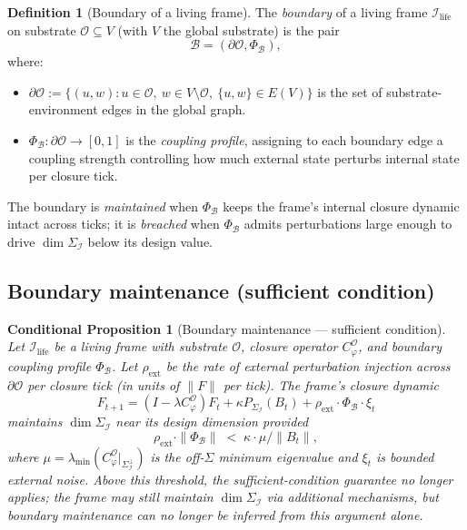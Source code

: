 \documentclass[11pt]{article}
\theoremstyle{plain}
\newtheorem{conditional}[theorem]{Conditional Proposition}
\theoremstyle{definition}
\newtheorem{definition}[theorem]{Definition}
\theoremstyle{remark}
\newcommand{\Ical}{\mathcal{I}}
\newcommand{\Ocal}{\mathcal{O}}
\newcommand{\Bcal}{\mathcal{B}}
\newcommand{\Cph}{C_\varphi}
\newcommand{\Ilife}{\Ical_{\mathrm{life}}}
\begin{document}
\begin{definition}[Boundary of a living frame]\label{def:boundary}
The \emph{boundary} of a living frame $\Ilife$ on substrate $\Ocal \subseteq V$ (with $V$ the global substrate) is the pair
\[
  \Bcal = (\partial \Ocal, \Phi_\Bcal),
\]
where:
\begin{itemize}[leftmargin=2em]
\item $\partial \Ocal := \{(u, w) : u \in \Ocal,\ w \in V \setminus \Ocal,\ \{u, w\} \in E(V)\}$ is the set of substrate-environment edges in the global graph.
\item $\Phi_\Bcal : \partial \Ocal \to [0, 1]$ is the \emph{coupling profile}, assigning to each boundary edge a coupling strength controlling how much external state perturbs internal state per closure tick.
\end{itemize}
The boundary is \emph{maintained} when $\Phi_\Bcal$ keeps the frame's internal closure dynamic intact across ticks; it is \emph{breached} when $\Phi_\Bcal$ admits perturbations large enough to drive $\dim \Sigma_\Ical$ below its design value.
\end{definition}

\subsection{Boundary maintenance (sufficient condition)}

\begin{conditional}[Boundary maintenance --- sufficient condition]\label{thm:boundary-maintenance}
Let $\Ilife$ be a living frame with substrate $\Ocal$, closure operator $\Cph^\Ocal$, and boundary coupling profile $\Phi_\Bcal$. Let $\rho_{\mathrm{ext}}$ be the rate of external perturbation injection across $\partial \Ocal$ per closure tick (in units of $\|F\|$ per tick). The frame's closure dynamic
\[
  F_{t+1} = (I - \lambda \Cph^\Ocal) F_t + \kappa P_{\Sigma_\Ical}(B_t) + \rho_{\mathrm{ext}} \cdot \Phi_\Bcal \cdot \xi_t
\]
maintains $\dim \Sigma_\Ical$ near its design dimension provided
\[
  \rho_{\mathrm{ext}} \cdot \|\Phi_\Bcal\| \;<\; \kappa \cdot \mu / \|B_t\|,
\]
where $\mu = \lambda_{\min}(\Cph^\Ocal|_{\Sigma_\Ical^\perp})$ is the off-$\Sigma$ minimum eigenvalue and $\xi_t$ is bounded external noise. Above this threshold, the sufficient-condition guarantee no longer applies; the frame may still maintain $\dim \Sigma_\Ical$ via additional mechanisms, but boundary maintenance can no longer be inferred from this argument alone.
\end{conditional}
\end{document}

